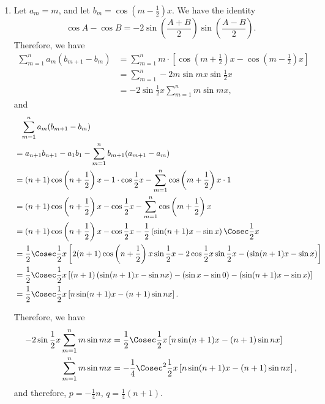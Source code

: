 \begin{enumerate}
    \item Let \(a_m = m\), and let \(b_m = \cos \left(m - \frac{1}{2}\right)x\). We have the identity
    \[
        \cos A - \cos B = - 2 \sin\left(\frac{A + B}{2}\right) \sin \left(\frac{A - B}{2}\right).
    \]
    Therefore, we have
    \begin{align*}
        \sum_{m = 1}^{n} a_m (b_{m + 1} - b_m) &= \sum_{m = 1}^{n} m \cdot \left[\cos \left(m + \frac{1}{2}\right)x - \cos \left(m - \frac{1}{2}\right)x\right]\\
        &= \sum_{m = 1}^{n} -2m \sin mx \sin \frac{1}{2}x\\
        &= -2 \sin \frac{1}{2} x \sum_{m = 1}^{n} m \sin mx, 
    \end{align*}
    and
    \begin{align*}
        &\phantom{=} \sum_{m = 1}^{n} a_m (b_{m + 1} - b_m)\\
        &= a_{n + 1} b_{n + 1} - a_1 b_1 - \sum_{m = 1}^{n} b_{m + 1} (a_{m + 1} - a_m)\\
        &= (n + 1) \cos \left(n + \frac{1}{2}\right)x - 1 \cdot \cos \frac{1}{2} x - \sum_{m = 1}^{n} \cos\left(m + \frac{1}{2}\right)x \cdot 1\\
        &= (n + 1) \cos \left(n + \frac{1}{2}\right)x - \cos \frac{1}{2} x - \sum_{m = 1}^{n} \cos\left(m + \frac{1}{2}\right)x\\
        &= (n + 1) \cos \left(n + \frac{1}{2}\right)x - \cos \frac{1}{2} x - \frac{1}{2}\left(\sin (n + 1)x - \sin x\right)\Cosec \frac{1}{2}x\\
        &= \frac{1}{2} \Cosec \frac{1}{2}x \left[2(n + 1) \cos \left(n + \frac{1}{2}\right)x \sin \frac{1}{2}x - 2 \cos \frac{1}{2}x \sin \frac{1}{2}x - \left(\sin (n + 1)x - \sin x\right)\right]\\
        &= \frac{1}{2} \Cosec \frac{1}{2}x \left[(n + 1) \left(\sin(n + 1)x - \sin nx\right) - (\sin x - \sin 0) - \left(\sin (n + 1)x - \sin x\right)\right]\\
        &= \frac{1}{2} \Cosec \frac{1}{2}x \left[n \sin(n + 1)x - (n + 1) \sin nx\right].
    \end{align*}

    Therefore, we have
    \begin{align*}
        -2 \sin \frac{1}{2} x \sum_{m = 1}^{n} m \sin mx &= \frac{1}{2} \Cosec \frac{1}{2}x \left[n \sin(n + 1)x - (n + 1) \sin nx\right]\\
        \sum_{m = 1}^{n} m \sin mx &= - \frac{1}{4} \Cosec^2 \frac{1}{2}x \left[n \sin(n + 1)x - (n + 1) \sin nx\right],
    \end{align*}
    and therefore, \(p = -\frac{1}{4}n\), \(q = \frac{1}{4}(n + 1)\).
\end{enumerate}